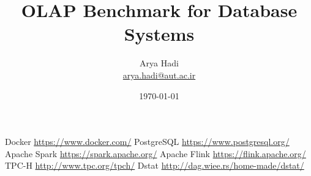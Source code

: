 \documentclass[letterpaper,12pt]{article}
\begin{document}
\title{OLAP Benchmark for Database Systems}
\author{Arya Hadi \\ \href{mailto:arya.hadi@aut.ac.ir}{arya.hadi@aut.ac.ir}}
\date{\today}
\maketitle

% 




\begin{thebibliography}{9}
    Docker \href{https://www.docker.com/}{https://www.docker.com/}
    PostgreSQL \href{https://www.postgresql.org/}{https://www.postgresql.org/}
    Apache Spark \href{https://spark.apache.org/}{https://spark.apache.org/}
    Apache Flink \href{https://flink.apache.org/}{https://flink.apache.org/}
    TPC-H \href{http://www.tpc.org/tpch/}{http://www.tpc.org/tpch/}
    Dstat \href{http://dag.wiee.rs/home-made/dstat/}{http://dag.wiee.rs/home-made/dstat/}
\end{thebibliography}
\end{document}
